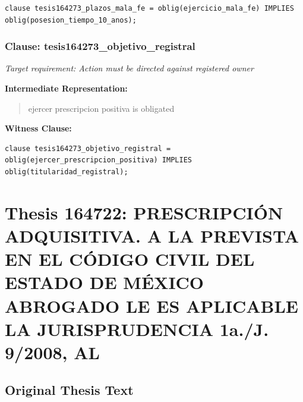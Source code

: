 \documentclass[11pt,a4paper]{article}
\begin{document}
\begin{lstlisting}[style=witnessstyle, language=Witness]
clause tesis164273_plazos_mala_fe = oblig(ejercicio_mala_fe) IMPLIES oblig(posesion_tiempo_10_anos);
\end{lstlisting}

\subsubsection{Clause: tesis164273\_objetivo\_registral}

\textit{Target requirement: Action must be directed against registered owner}

\textbf{Intermediate Representation:}

\begin{quote}
ejercer prescripcion positiva is obligated
\end{quote}

\textbf{Witness Clause:}

\begin{lstlisting}[style=witnessstyle, language=Witness]
clause tesis164273_objetivo_registral = oblig(ejercer_prescripcion_positiva) IMPLIES oblig(titularidad_registral);
\end{lstlisting}

\newpage

\section{Thesis 164722: PRESCRIPCIÓN ADQUISITIVA. A LA PREVISTA EN EL CÓDIGO CIVIL DEL ESTADO DE MÉXICO ABROGADO LE ES APLICABLE LA JURISPRUDENCIA 1a./J. 9/2008, AL}
\label{thesis:164722}

\subsection{Original Thesis Text}
\end{document}
